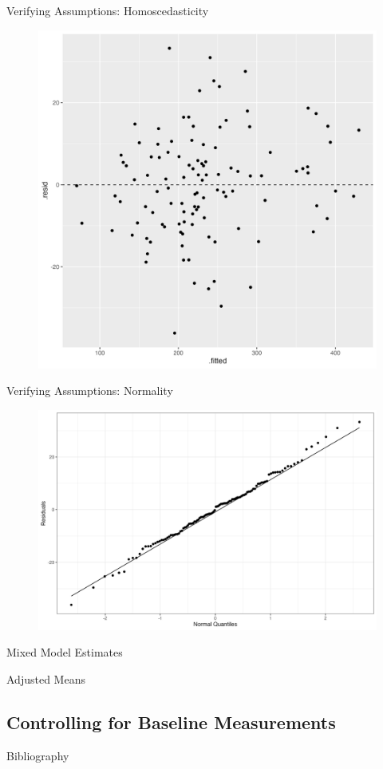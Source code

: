 \documentclass{beamer}
\begin{document}
\begin{frame}{Verifying Assumptions: Homoscedasticity}
    \begin{figure}
        \centering
        \includegraphics[width=0.75\linewidth]{report/figures/presentation/homoscedasticity.png}
    \end{figure}
\end{frame}

\begin{frame}{Verifying Assumptions: Normality}
    \begin{figure}
        \centering
        \includegraphics[width=\linewidth]{report/figures/presentation/qqplot.png}
    \end{figure}
\end{frame}

\begin{frame}{Mixed Model Estimates}
    
\end{frame}

\begin{frame}{Adjusted Means}
    
\end{frame}



\subsection{Controlling for Baseline Measurements}

\begin{frame}{Bibliography}
    
    
\end{frame}
\end{document}
